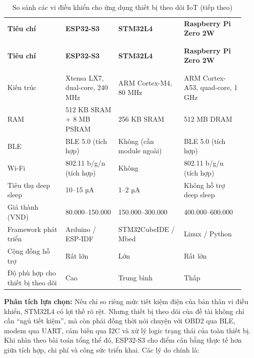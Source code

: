 \documentclass[a4paper]{extarticle}
\newcommand{\thesissettableid}[2]{%
  \renewcommand{\thetable}{#1}%
  \renewcommand{\theHtable}{#2}%
}
\begin{document}
{\thesissettableid{2.3}{tab-ch2-mcu-comparison-for-tracker}
\def\LTcaptype{table}
\begin{longtable}{|L{0.230\linewidth}|L{0.218\linewidth}|L{0.260\linewidth}|L{0.246\linewidth}|}
\caption{So sánh các vi điều khiển cho ứng dụng thiết bị theo dõi IoT}\label{tab:ch2-mcu-comparison-for-tracker}\\
\hline \textbf{Tiêu chí} & \textbf{ESP32-S3} & \textbf{STM32L4} & \textbf{Raspberry Pi Zero 2W} \\
\\\hline
\endfirsthead
\caption[]{So sánh các vi điều khiển cho ứng dụng thiết bị theo dõi IoT (tiếp theo)}\\
\hline \textbf{Tiêu chí} & \textbf{ESP32-S3} & \textbf{STM32L4} & \textbf{Raspberry Pi Zero 2W} \\
\\\hline
\endhead
\\\hline
\endfoot
\endlastfoot
Kiến trúc & Xtensa LX7, dual-core, 240 MHz & ARM Cortex-M4, 80 MHz & ARM
Cortex-A53, quad-core, 1 GHz \\\hline
RAM & 512 KB SRAM + 8 MB PSRAM & 256 KB SRAM & 512 MB DRAM \\\hline
BLE & BLE 5.0 (tích hợp) & Không (cần module ngoài) & BLE 5.0 (tích
hợp) \\\hline
Wi-Fi & 802.11 b/g/n (tích hợp) & Không & 802.11 b/g/n (tích hợp) \\\hline
Tiêu thụ deep sleep & 10--15 µA & 1--2 µA & Không hỗ trợ deep sleep \\\hline
Giá thành (VND) & 80.000--150.000 & 150.000--300.000 &
400.000--600.000 \\\hline
Framework phát triển & Arduino / ESP-IDF & STM32CubeIDE / Mbed & Linux /
Python \\\hline
Cộng đồng hỗ trợ & Rất lớn & Lớn & Rất lớn \\\hline
Độ phù hợp cho thiết bị theo dõi & Cao & Trung bình & Thấp \\\hline
\end{longtable}
}

\textbf{Phân tích lựa chọn:} Nếu chỉ so riêng mức tiết kiệm điện của bản
thân vi điều khiển, STM32L4 có lợi thế rõ rệt. Nhưng thiết bị theo dõi của đề tài
không chỉ cần ``ngủ tiết kiệm'', mà còn phải đồng thời nói chuyện với
OBD2 qua BLE, modem qua UART, cảm biến qua I2C và xử lý logic trạng
thái của toàn thiết bị. Khi nhìn theo bài toán tổng thể đó, ESP32-S3 cho
điểm cân bằng thực tế hơn giữa tích hợp, chi phí và công sức triển khai.
Các lý do chính là:
\end{document}
